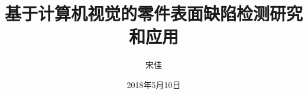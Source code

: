 \documentclass[master,winfonts]{njuthesis}
\title{基于计算机视觉的零件表面缺陷检测研究和应用}
\author{宋佳}
\institute{南京大学}
\date{2018年5月10日}
\begin{document}

\maketitle

\makeenglishtitle







%
\tableofcontents



\mainmatter


















\nocite{*}



\makelicense

\end{document}
